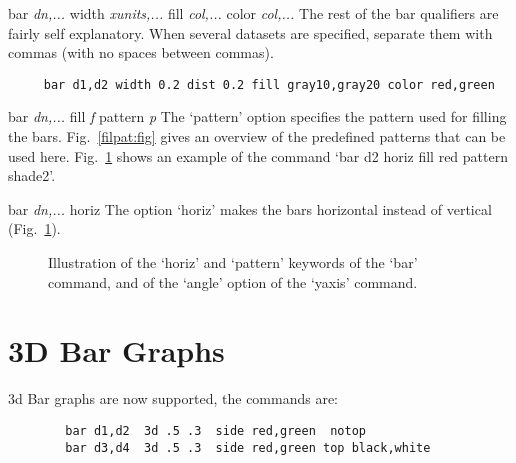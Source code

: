 \begin{commanddescription}
 
\item[{\sf bar {\it dn,...} width {\it xunits,...} fill {\it col,...} color {\it col,...} }]
The rest of the bar qualifiers are fairly self explanatory.
When several datasets are specified, separate them with commas
(with no spaces between commas).

\preglecode{}
\begin{Verbatim}
     bar d1,d2 width 0.2 dist 0.2 fill gray10,gray20 color red,green
\end{Verbatim}
\postglecode{}

\item[{\sf bar {\it dn,...} fill {\it f} pattern {\it p}}]
The `{\sf pattern}' option specifies the pattern used for filling the bars. Fig.~\ref{filpat:fig} gives an overview of the predefined patterns that can be used here. Fig.~\ref{hbar:fig} shows an example of the command `{\sf bar d2 horiz fill red pattern shade2}'.

\item[{\sf bar {\it dn,...} horiz}]
The option `{\sf horiz}' makes the bars horizontal instead of vertical (Fig.~\ref{hbar:fig}).

\begin{figure}[tb]
\centering

\caption{\label{hbar:fig}Illustration of the `{\sf horiz}' and `{\sf pattern}' keywords of the `{\sf bar}' command, and of the `{\sf angle}' option of the `{\sf yaxis}' command.}
\end{figure}
\end{commanddescription}

\section{3D Bar Graphs}
3d Bar graphs are now supported, the commands are:

\preglecode{}
\begin{Verbatim}
        bar d1,d2  3d .5 .3  side red,green  notop
        bar d3,d4  3d .5 .3  side red,green top black,white
\end{Verbatim}
\postglecode{}

